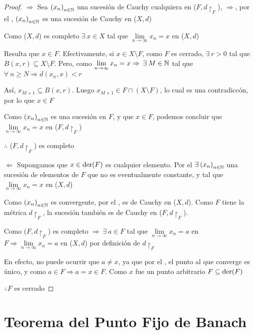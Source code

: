 \begin{proof}
    $\Rightarrow$ Sea ${\left( x_n \right)}_{n \in \mathbb{N}}$ una sucesión de Cauchy cualquiera en ($F, d \restriction_F$), $\Rightarrow$, por el , ${\left( x_n \right)}_{n \in \mathbb{N}}$ es una sucesión de Cauchy en ($X,d$)

    Como ($X,d$) es completo $\exists \: x \in X$ tal que $\lim\limits_{n \to \infty} x_n = x$ en ($X,d$)

    Resulta que $x \in F$. Efectivamente, si $x \in X \setminus F$, como $F$ es cerrado, $\exists \: r > 0$ tal que $B(x,r) \subseteq X \setminus F$. Pero, como $\lim\limits_{n \to \infty} x_n = x \Rightarrow \: \exists \: M \in \N$ tal que $\forall \: n \geqslant N \Rightarrow d(x_n, x) < r$

    Así, $x_{M+1} \subseteq B(x,r)$. Luego $x_{M+1} \in F \cap (X \setminus F)$, lo cual es una contradiccón, por lo que $x \in F$

    Como ${\left( x_n \right)}_{n \in \mathbb{N}}$ es una sucesión en $F$, y que $x \in F$, podemos concluir que $\lim\limits_{n \to \infty} x_n = x$ en ($F, d \restriction_F$)

    $\therefore$ ($F, d \restriction_F$) es completo

    $\Leftarrow$ Supongamos que $x \in \mathrm{der}(F)$ es cualquier elemento. Por el  $\exists \: {\left( x_n \right)}_{n \in \mathbb{N}}$ una sucesión de elementos de $F$ que no es eventualmente constante, y tal que $\lim\limits_{n \to \infty} x_n = x$ en ($X,d$)

    Como ${\left( x_n \right)}_{n \in \mathbb{N}}$ es convergente, por el , es de Cauchy en ($X,d$). Como $F$ tiene la métrica $d \restriction_F$, la sucesión también es de Cauchy en ($F, d \restriction_F$). 
    
    Como ($F, d \restriction_F$) es completo $\Rightarrow \: \exists \: a \in F$ tal que $\lim\limits_{n \to \infty} x_n = a$ en $F \Rightarrow \lim\limits_{n \to \infty} x_n = a$ en ($X,d$) por definición de $d \restriction_F$

    En efecto, no puede ocurrir que $a \neq x$, ya que por el , el punto al que converge es único, y como $a \in F \Rightarrow a = x \in F$. Como $x$ fue un punto arbitrario $F \subseteq \mathrm{der}(F)$

    $\therefore F$ es cerrado
\end{proof}

\section{Teorema del Punto Fijo de Banach}

